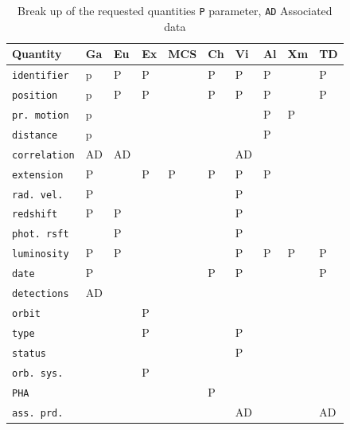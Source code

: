 \documentclass[11pt,a4paper]{ivoa}
\begin{document}
\begin{table}[ht!]
     \tiny
     \begin{tabular}{|p{2.4cm}|p{0.4cm}|p{0.4cm}|p{0.4cm}|p{0.6cm}|p{0.4cm}|p{0.4cm}|p{0.4cm}|p{0.4cm}|p{0.4cm}|}
       \hline Quantity &  Ga &  Eu &  Ex &  MCS  &  Ch&  Vi &  Al &  Xm&  TD \\
       \hline  \texttt{identifier}      &  p & P  &P& &P&P &P&  & P \\              
       \hline  \texttt{position}      &  p & P  &P& &P&P &P&  & P \\       
       \hline  \texttt{pr. motion}   & p &   &   &    &  &   &P&P&    \\       
       \hline  \texttt{distance}     & p &   &   &    &  &   &P&  &    \\       
       \hline  \texttt{correlation}   & AD &AD&   &    &  &AD &   &  &    \\       
       \hline  \texttt{extension}     &P&   &P&P &P&P& P&  &    \\       
       \hline  \texttt{rad. vel.}       &  P &   &   &    &  &P&   &  &    \\       
       \hline  \texttt{redshift}        &  P &P&   &    &  &P&   &  &    \\             
       \hline  \texttt{phot. rsft}      &   &P&   &    &  &P&   &  &    \\       
       \hline  \texttt{luminosity}    & P&P&   &    &  &P&P&P&P\\       
       \hline  \texttt{date}             & P  &   &   &    & P&P&   &  &P\\       
       \hline  \texttt{detections}    &  AD &   &   &    &  &   &   &  &    \\       
       \hline  \texttt{orbit}             &   &   &P& &  &   &   &  &    \\       
       \hline  \texttt{type}             &   &   & P& &  &P&   &  &    \\      
       \hline  \texttt{status}          &   &   &   &    &  &P&   &  &    \\       
       \hline  \texttt{orb. sys.}      &   &   &  P &    &  &   &   &  &    \\       
       \hline  \texttt{PHA}            &   &   &   &    &P&   &   &  &    \\       
       \hline  \texttt{ass. prd.}     &   &   &   &    &  &AD&   &  &AD \\       
       \hline 
     \end{tabular}
     \caption{ Break up of the requested quantities \texttt{P} parameter, \texttt{AD} Associated data} 
     \label{tab:q_breakup}
 \end{table}
\end{document}
